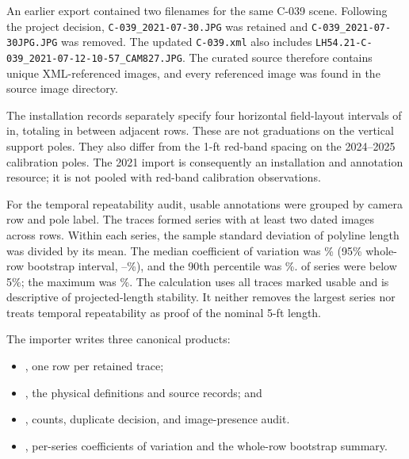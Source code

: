 \documentclass[review,12pt,authoryear]{elsarticle}
\begin{document}
An earlier export contained two filenames for the same C-039 scene. Following the project decision, \texttt{C-039\_2021-07-30.JPG} was retained and \texttt{C-039\_2021-07-30JPG.JPG} was removed. The updated \texttt{C-039.xml} also includes \texttt{LH54.21-C-039\_2021-07-12-10-57\_CAM827.JPG}. The curated source therefore contains \ManualPoleImages{} unique XML-referenced images, and every referenced image was found in the source image directory.

The installation records separately specify four horizontal field-layout intervals of \FieldMarkIntervalIn{} in, totaling \AdjacentRowSpacingIn{} in between adjacent rows. These are not graduations on the vertical support poles. They also differ from the 1-ft red-band spacing on the 2024--2025 calibration poles. The 2021 import is consequently an installation and annotation resource; it is not pooled with red-band calibration observations.

For the temporal repeatability audit, usable annotations were grouped by camera row and pole label. The \ManualPoleUsable{} traces formed \PoleRepeatabilitySeries{} series with at least two dated images across \PoleRepeatabilityRows{} rows. Within each series, the sample standard deviation of polyline length was divided by its mean. The median coefficient of variation was \PoleRepeatabilityMedianCV{}\% (95\% whole-row bootstrap interval, \PoleRepeatabilityMedianCVLo{}--\PoleRepeatabilityMedianCVHi{}\%), and the 90th percentile was \PoleRepeatabilityNinetiethCV{}\%. \PoleRepeatabilityBelowFive{} of \PoleRepeatabilitySeries{} series were below 5\%; the maximum was \PoleRepeatabilityMaximumCV{}\%. The calculation uses all traces marked usable and is descriptive of projected-length stability. It neither removes the largest series nor treats temporal repeatability as proof of the nominal 5-ft length.

The importer writes three canonical products:
\begin{itemize}
\small
\item {}, one row per retained trace;
\item {}, the physical definitions and source records; and
\item {}, counts, duplicate decision, and image-presence audit.
\item {}, per-series coefficients of variation and the whole-row bootstrap summary.
\end{itemize}
\end{document}
